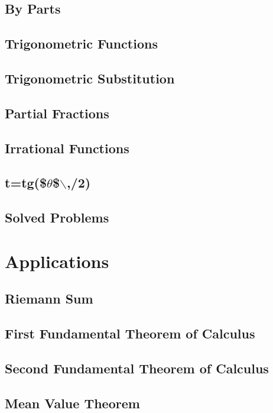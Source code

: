 \documentclass[a4paper,12pt]{article}
\begin{document}
\subsection{By Parts}
\label{sec:orgb6e5db8}
\subsection{Trigonometric Functions}
\label{sec:org309dc63}
\subsection{Trigonometric Substitution}
\label{sec:org14587bb}
\subsection{Partial Fractions}
\label{sec:org7efd929}
\subsection{Irrational Functions}
\label{sec:org75f9e88}
\subsection{t=tg(\$\(\theta\)\$$\backslash$,/2)}
\label{sec:orgcf214a6}
\subsection{Solved Problems}
\label{sec:org5ab093e}

\newpage

\section{Applications}
\label{sec:orge3e9222}
\subsection{Riemann Sum}
\label{sec:org96b9807}
\subsection{First Fundamental Theorem of Calculus}
\label{sec:orgea4d906}
\subsection{Second Fundamental Theorem of Calculus}
\label{sec:orgc2eac28}
\subsection{Mean Value Theorem}
\label{sec:orgb4e1a70}
\end{document}
